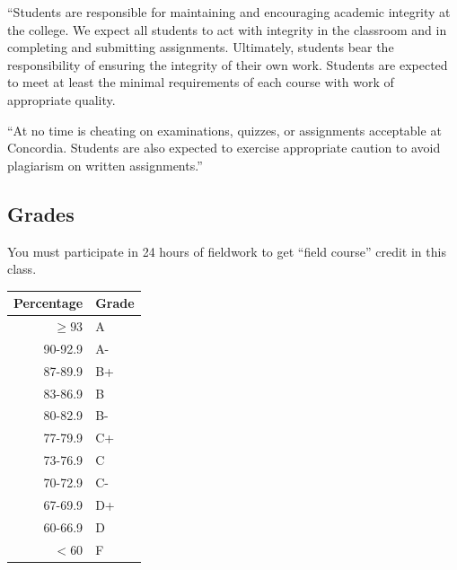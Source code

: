 \documentclass{tufte-handout}
\begin{document}
``Students are responsible for maintaining and encouraging academic integrity at the college. We expect all students to act with integrity in the classroom and in completing and submitting assignments. Ultimately, students bear the responsibility of ensuring the integrity of their own work. Students are expected to meet at least the minimal requirements of each course with work of appropriate quality. 


``At no time is cheating on examinations, quizzes, or assignments acceptable at Concordia. Students are also expected to exercise appropriate caution to avoid plagiarism on written assignments.''

\newpage


\subsection{Grades}

You must participate in 24 hours of fieldwork to get ``field course'' credit in this class.


\begin{margintable}
\begin{tabular}{rl}
Percentage & Grade \\
\hline 
$\ge93$ & A \\
90-92.9 & A- \\
87-89.9 & B+ \\
83-86.9 & B \\
80-82.9 & B- \\
77-79.9 & C+ \\
73-76.9 & C \\
70-72.9 & C- \\
67-69.9 & D+ \\
60-66.9 & D \\
$<60$ & F \\
\hline
\end{tabular}
\end{margintable}
\end{document}
